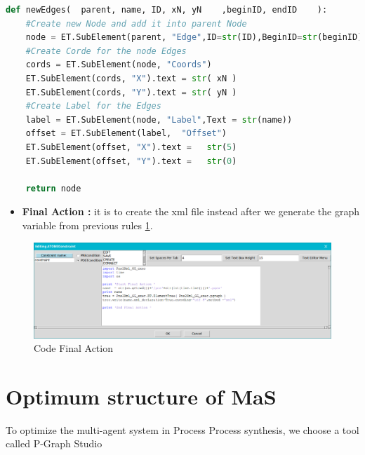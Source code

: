 \vspace{0.7cm}
\begin{lstlisting}[language=Python, caption=Python Function new Edges]
def newEdges(  parent, name, ID, xN, yN    ,beginID, endID    ):
	#Create new Node and add it into parent Node	
	node = ET.SubElement(parent, "Edge",ID=str(ID),BeginID=str(beginID),EndID=str(endID),Rate=str(name),Title=str(name), ArrowOnCenter="true", ArrowPosition="50")  
	#Create Corde for the node Edges
	cords = ET.SubElement(node, "Coords")
	ET.SubElement(cords, "X").text = str( xN )
	ET.SubElement(cords, "Y").text = str( yN )
	#Create Label for the Edges
	label = ET.SubElement(node, "Label",Text = str(name))
	offset = ET.SubElement(label,  "Offset")
	ET.SubElement(offset, "X").text =   str(5)
	ET.SubElement(offset, "Y").text =   str(0)
 
	return node 
\end{lstlisting}


\pagebreak
\begin{itemize}
\item \textbf{Final Action :} it is to create the xml file instead after we generate the graph variable from previous rules  \ref{fig:Code Final Action}. 
   
\end{itemize}

\begin{figure}[th]
	\centering  %
 	\includegraphics[scale=0.38]{ch3/img/FinAct}
	\caption{\label{fig:Code Final Action}Code Final Action}
\end{figure}
\section{Optimum structure of MaS \label{sec:optim} }

To optimize the multi-agent system in  Process Process synthesis, 
we choose a tool called  P-Graph Studio 

